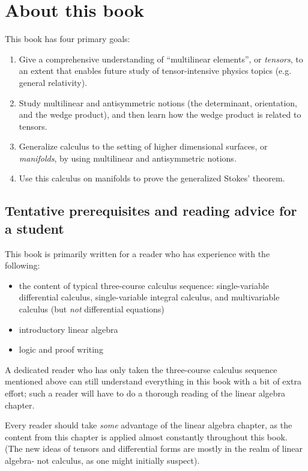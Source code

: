 \chapter*{About this book}

This book has four primary goals:

\begin{enumerate}
    \item Give a comprehensive understanding of ``multilinear elements'', or \textit{tensors}, to an extent that enables future study of tensor-intensive physics topics (e.g. general relativity).
    \item Study multilinear and antisymmetric notions (the determinant, orientation, and the wedge product), and then learn how the wedge product is related to tensors.
    \item Generalize calculus to the setting of higher dimensional surfaces, or \textit{manifolds}, by using multilinear and antisymmetric notions.
    \item Use this calculus on manifolds to prove the generalized Stokes' theorem.
\end{enumerate}

\section*{Tentative prerequisites and reading advice for a student}

This book is primarily written for a reader who has experience with the following:

\begin{itemize}
    \item the content of typical three-course calculus sequence: single-variable differential calculus, single-variable integral calculus, and multivariable calculus (but \textit{not} differential equations)
    \item introductory linear algebra
    \item logic and proof writing
\end{itemize}

A dedicated reader who has only taken the three-course calculus sequence mentioned above can still understand everything in this book with a bit of extra effort; such a reader will have to do a thorough reading of the linear algebra chapter.

Every reader should take \textit{some} advantage of the linear algebra chapter, as the content from this chapter is applied almost constantly throughout this book. (The new ideas of tensors and differential forms are mostly in the realm of linear algebra- not calculus, as one might initially suspect).

